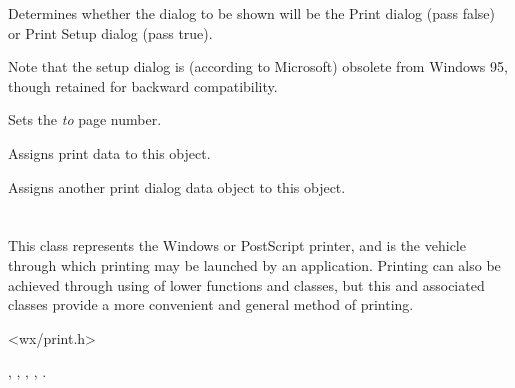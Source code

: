 \label{wxprintdialogdatasetsetupdialog}


Determines whether the dialog to be shown will be the Print dialog
(pass false) or Print Setup dialog (pass true).

Note that the setup dialog is (according to Microsoft) obsolete from
Windows 95, though retained for backward compatibility.


\label{wxprintdialogdatasettopage}


Sets the {\it to} page number.


\label{wxprintdialogdataassign}


Assigns print data to this object.


Assigns another print dialog data object to this object.

\section{}\label{wxprinter}

This class represents the Windows or PostScript printer, and is the vehicle through
which printing may be launched by an application. Printing can also
be achieved through using of lower functions and classes, but
this and associated classes provide a more convenient and general
method of printing.




<wx/print.h>


, , ,\rtfsp
{}, .



\label{wxprinterctor}

